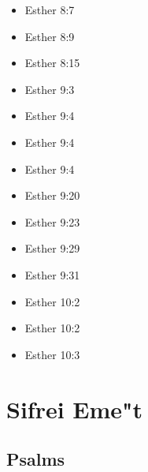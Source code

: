 \documentclass[14pt]{article}
\begin{document}
\begin{multicols}{2}
\begin{itemize}
							\item Esther 8:7
							
							\item Esther 8:9
							
							\item Esther 8:15
							
							\item Esther 9:3
							
							\item Esther 9:4
							
							\item Esther 9:4
							
							\item Esther 9:4
							
							\item Esther 9:20
							
							\item Esther 9:23
							
							\item Esther 9:29
							
							\item Esther 9:31
							
							\item Esther 10:2
							
							\item Esther 10:2
							
							\item Esther 10:3
							
						\end{itemize}\end{multicols}
					
\section{Sifrei Eme"t}

\subsection{Psalms}
\end{document}
